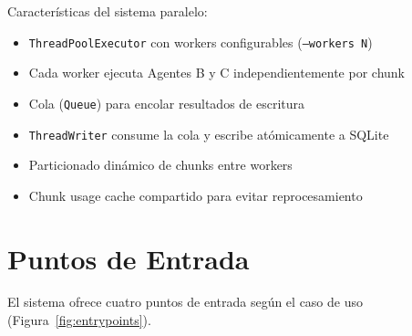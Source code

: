 \documentclass[10pt,twocolumn,letterpaper]{article}
\begin{document}
Caracter\'isticas del sistema paralelo:
\begin{itemize}[nosep,leftmargin=*]
  \item \texttt{ThreadPoolExecutor} con workers configurables (\texttt{--workers N})
  \item Cada worker ejecuta Agentes B y C independientemente por chunk
  \item Cola (\texttt{Queue}) para encolar resultados de escritura
  \item \texttt{ThreadWriter} consume la cola y escribe at\'omicamente a SQLite
  \item Particionado din\'amico de chunks entre workers
  \item Chunk usage cache compartido para evitar reprocesamiento
\end{itemize}

\section{Puntos de Entrada}

El sistema ofrece cuatro puntos de entrada seg\'un el caso de uso (Figura~\ref{fig:entrypoints}).
\end{document}
